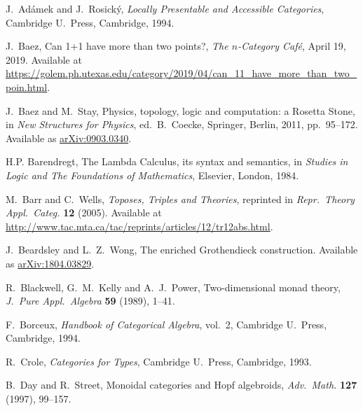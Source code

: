 \documentclass{amsart}
\theoremstyle{definition}
\begin{document}
\begin{thebibliography}{100}

 J.\ Ad\'{a}mek and J.\ Rosick\'{y}, \textsl{Locally Presentable and Accessible Categories}, Cambridge U.\ Press, Cambridge, 1994.

 J.\ Baez, Can 1+1 have more than two points?, \textsl{The $n$-Category Caf\'e}, April 19, 2019.   Available at \href{https://golem.ph.utexas.edu/category/2019/04/can_11_have_more_than_two_poin.html}{https://golem.ph.utexas.edu/category/2019/04/can\_11\_have\_more\_than\_two\_poin.html}.

 J.\ Baez and M.\ Stay, Physics, topology, logic and computation: a Rosetta Stone, in \textsl{New Structures for Physics}, ed.\ B.\ Coecke, Springer, Berlin, 2011, pp.\ 95--172.  Available as \href{https://arxiv.org/abs/0903.0340}{arXiv:0903.0340}.

 H.P. Barendregt, The Lambda Calculus, its syntax and semantics, in \textsl{Studies in Logic and The Foundations of Mathematics}, Elsevier, London, 1984.
	
 M.\ Barr and C.\ Wells, \textsl{Toposes, Triples and Theories}, reprinted in \textsl{Repr.\ Theory Appl.\ Categ.} \textbf{12} (2005).   Available at \href{http://www.tac.mta.ca/tac/reprints/articles/12/tr12abs.html}{http://www.tac.mta.ca/tac/reprints/articles/12/tr12abs.html}.

 J.\ Beardsley and L.\ Z.\ Wong, The enriched Grothendieck construction.  Available as \href{https://arxiv.org/abs/1804.03829}{arXiv:1804.03829}.
	

 R.\ Blackwell, G.\ M.\ Kelly and A.\ J.\ Power, Two-dimensional monad theory, 
\textsl{J.\ Pure Appl.\ Algebra} \textbf{59} (1989), 1--41. 
 
 F.\ Borceux, \textsl{Handbook of Categorical Algebra}, vol.\ 2, Cambridge U.\ Press, Cambridge, 1994.

 R.\ Crole, \textsl{Categories for Types}, Cambridge U.\ Press, Cambridge, 1993.

 B.\ Day and R.\ Street, Monoidal categories and Hopf algebroids,
\textsl{Adv.\ Math.} \textbf{127} (1997), 99--157.


\end{thebibliography}
\end{document}
